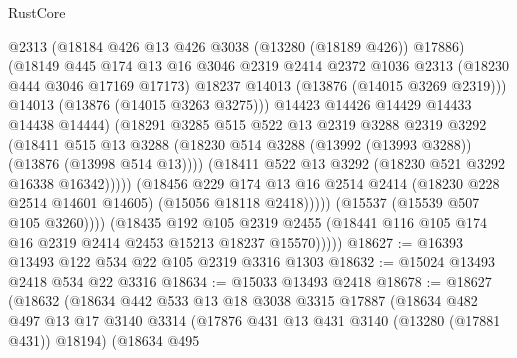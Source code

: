 \begin{lexlean}{RustCore}
\begin{coremodule}
                            @2313
                            (@18184 @426 @13 @426 @3038 (@13280 (@18189 @426)) @17886)
                            (@18149
                              @445
                              @174
                              @13
                              @16
                              @3046
                              @2319
                              @2414
                              @2372
                              @1036
                              @2313
                              (@18230 @444 @3046 @17169 @17173)
                              @18237
                              @14013
                              (@13876 (@14015 @3269 @2319)))
                            @14013
                            (@13876 (@14015 @3263 @3275)))
                          @14423
                          @14426
                          @14429
                          @14433
                          @14438
                          @14444)
                        (@18291
                          @3285
                          @515
                          @522
                          @13
                          @2319
                          @3288
                          @2319
                          @3292
                          (@18411
                            @515
                            @13
                            @3288
                            (@18230 @514 @3288 (@13992 (@13993 @3288)) (@13876 (@13998 @514 @13))))
                          (@18411 @522 @13 @3292 (@18230 @521 @3292 @16338 @16342)))))
                    (@18456
                      @229
                      @174
                      @13
                      @16
                      @2514
                      @2414
                      (@18230 @228 @2514 @14601 @14605)
                      (@15056 @18118 @2418)))))
              (@15537 (@15539 @507 @105 @3260))))
          (@18435
            @192
            @105
            @2319
            @2455
            (@18441 @116 @105 @174 @16 @2319 @2414 @2453 @15213 @18237 @15570)))))
@18627 := @16393 @13493 @122 @534 @22 @105 @2319 @3316 @1303
@18632 := @15024 @13493 @2418 @534 @22 @3316
@18634 := @15033 @13493 @2418
@18678 := @18627
    (@18632
      (@18634
        @442
        @533
        @13
        @18
        @3038
        @3315
        @17887
        (@18634
          @482
          @497
          @13
          @17
          @3140
          @3314
          (@17876 @431 @13 @431 @3140 (@13280 (@17881 @431)) @18194)
          (@18634
            @495

\end{coremodule}
\end{lexlean}
